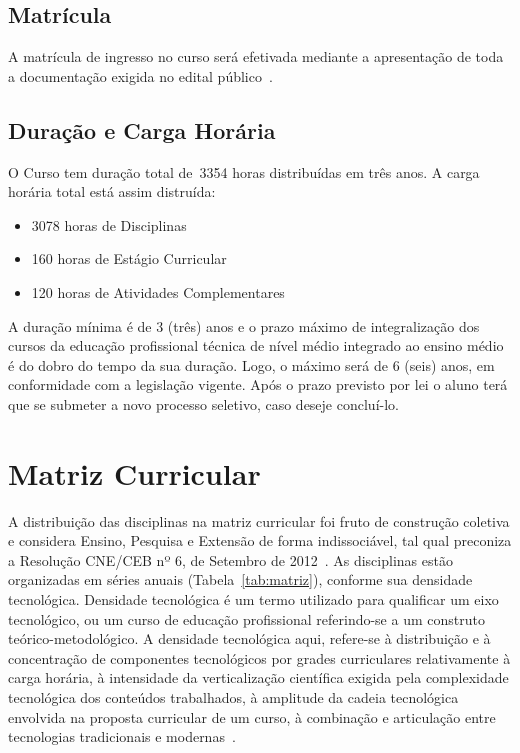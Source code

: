 \documentclass[11pt,fleqn]{book} %
\newcommand{\VER}[1]{\begingroup\color{red}#1\endgroup}
\begin{document}
\subsection{Matrícula}

A matrícula de ingresso no curso será efetivada mediante a apresentação de toda a documentação exigida no edital público~\cite{Resolucao22De2011}.

\subsection{Duração e Carga Horária}
\indent

O Curso tem duração total de~\VER{3354} horas distribuídas em três anos.
A carga horária total está assim distruída:
\begin{itemize}
	\item \VER{3078} horas de Disciplinas
	\item \VER{160} horas de Estágio Curricular
	\item \VER{120} horas de Atividades Complementares
\end{itemize}

A duração mínima é de 3 (três) anos e o prazo máximo de integralização dos cursos da educação profissional técnica de nível médio integrado ao ensino médio é do dobro do tempo da sua duração. 
Logo, o máximo será de 6 (seis) anos, em conformidade com a legislação vigente. 
Após o prazo previsto por lei o aluno terá que se submeter a novo processo seletivo, caso deseje concluí-lo.


\section{Matriz Curricular}\label{matriz}
\indent
%
%

A distribuição das disciplinas na matriz curricular foi fruto de construção coletiva e considera Ensino, Pesquisa e Extensão de forma indissociável, tal qual preconiza  a Resolução CNE/CEB nº 6, de Setembro de 2012~\cite{Resolucao06De2012}.
As disciplinas estão organizadas em séries anuais (Tabela~\ref{tab:matriz}), conforme sua densidade tecnológica.
Densidade tecnológica é um termo utilizado para qualificar um eixo tecnológico, ou um curso de educação profissional referindo-se a um construto teórico-metodológico. 
A densidade tecnológica aqui, refere-se à distribuição e à concentração de componentes tecnológicos por grades curriculares relativamente à carga horária, à intensidade da verticalização científica exigida pela complexidade tecnológica dos conteúdos trabalhados, à amplitude da cadeia tecnológica envolvida na proposta curricular de um curso, à combinação e articulação entre tecnologias tradicionais e modernas~\cite{Machado2010}.
\end{document}
